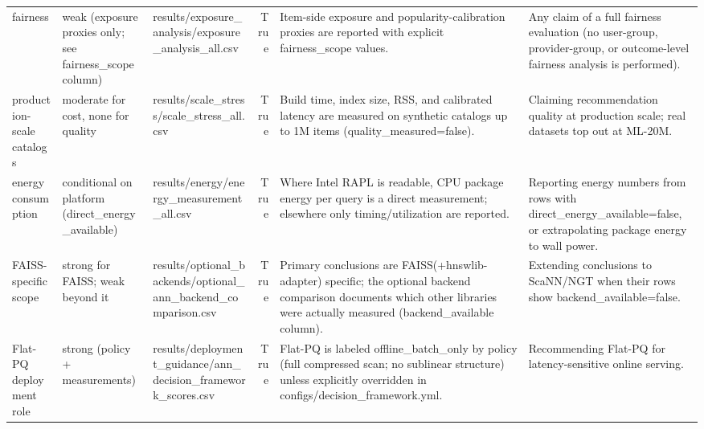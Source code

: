 \begin{tabular}{lllrll}
fairness & weak (exposure proxies only; see fairness_scope column) & results/exposure_analysis/exposure_analysis_all.csv & True & Item-side exposure and popularity-calibration proxies are reported with explicit fairness_scope values. & Any claim of a full fairness evaluation (no user-group, provider-group, or outcome-level fairness analysis is performed). \\
production-scale catalogs & moderate for cost, none for quality & results/scale_stress/scale_stress_all.csv & True & Build time, index size, RSS, and calibrated latency are measured on synthetic catalogs up to 1M items (quality_measured=false). & Claiming recommendation quality at production scale; real datasets top out at ML-20M. \\
energy consumption & conditional on platform (direct_energy_available) & results/energy/energy_measurement_all.csv & True & Where Intel RAPL is readable, CPU package energy per query is a direct measurement; elsewhere only timing/utilization are reported. & Reporting energy numbers from rows with direct_energy_available=false, or extrapolating package energy to wall power. \\
FAISS-specific scope & strong for FAISS; weak beyond it & results/optional_backends/optional_ann_backend_comparison.csv & True & Primary conclusions are FAISS(+hnswlib-adapter) specific; the optional backend comparison documents which other libraries were actually measured (backend_available column). & Extending conclusions to ScaNN/NGT when their rows show backend_available=false. \\
Flat-PQ deployment role & strong (policy + measurements) & results/deployment_guidance/ann_decision_framework_scores.csv & True & Flat-PQ is labeled offline_batch_only by policy (full compressed scan; no sublinear structure) unless explicitly overridden in configs/decision_framework.yml. & Recommending Flat-PQ for latency-sensitive online serving. \\
\bottomrule
\end{tabular}
